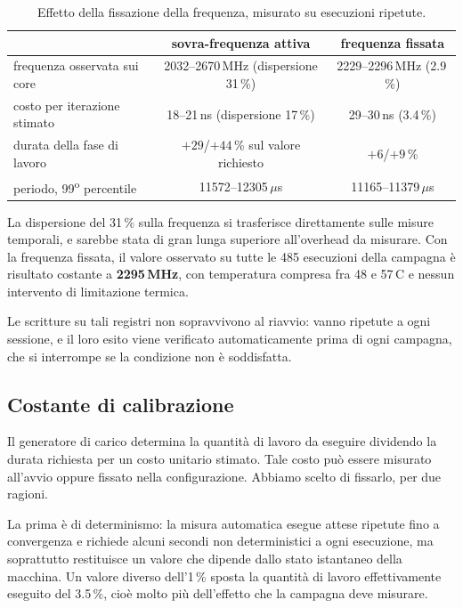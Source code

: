 \documentclass[11pt,a4paper]{article}
\newcommand{\us}{\,$\mu$s}
\begin{document}
\begin{table}[h]\centering\small
\begin{tabular}{lcc}
\toprule
 & \textbf{sovra-frequenza attiva} & \textbf{frequenza fissata} \\
\midrule
frequenza osservata sui core & 2032--2670\,MHz (dispersione 31\,\%) & 2229--2296\,MHz (2.9\,\%) \\
costo per iterazione stimato & 18--21\,ns (dispersione 17\,\%) & 29--30\,ns (3.4\,\%) \\
durata della fase di lavoro & $+29$/$+44$\,\% sul valore richiesto & $+6$/$+9$\,\% \\
periodo, 99\textsuperscript{o} percentile & 11572--12305\us & 11165--11379\us \\
\bottomrule
\end{tabular}
\caption{Effetto della fissazione della frequenza, misurato su esecuzioni ripetute.}
\end{table}

La dispersione del 31\,\% sulla frequenza si trasferisce direttamente sulle misure temporali, e
sarebbe stata di gran lunga superiore all'overhead da misurare. Con la frequenza fissata, il valore
osservato su tutte le 485 esecuzioni della campagna \`e risultato costante a \textbf{2295\,MHz},
con temperatura compresa fra 48 e 57\,\textdegree C e nessun intervento di limitazione termica.

Le scritture su tali registri non sopravvivono al riavvio: vanno ripetute a ogni sessione, e il
loro esito viene verificato automaticamente prima di ogni campagna, che si interrompe se la
condizione non \`e soddisfatta.

\subsection{Costante di calibrazione}

Il generatore di carico determina la quantit\`a di lavoro da eseguire dividendo la durata
richiesta per un costo unitario stimato. Tale costo pu\`o essere misurato all'avvio oppure fissato
nella configurazione. Abbiamo scelto di fissarlo, per due ragioni.

La prima \`e di determinismo: la misura automatica esegue attese ripetute fino a convergenza e
richiede alcuni secondi non deterministici a ogni esecuzione, ma soprattutto restituisce un valore
che dipende dallo stato istantaneo della macchina. Un valore diverso dell'1\,\% sposta la quantit\`a
di lavoro effettivamente eseguito del 3.5\,\%, cio\`e molto pi\`u dell'effetto che la campagna deve
misurare.
\end{document}
